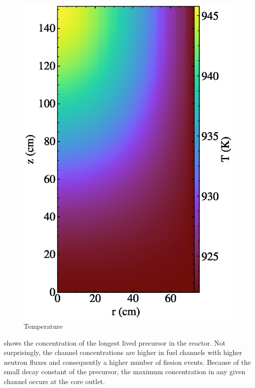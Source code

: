 \documentclass{article}
\begin{document}
\begin{figure}
  \centering
  \includegraphics{auto_diff_rho_temp.eps}
  \caption{Temperature}
  \label{fig:temp}
\end{figure}

 shows the concentration of the longest lived precursor in the
reactor. Not surprisingly, the channel concentrations are higher in fuel channels
with higher neutron fluxes and consequently a higher number of fission
events. Because of the small decay constant of the precursor, the maximum
concentration in any given channel occurs at the core outlet.
\end{document}
